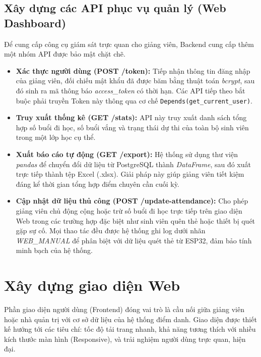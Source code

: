 \documentclass[12pt,a4paper]{report}
\begin{document}
\subsection{Xây dựng các API phục vụ quản lý (Web Dashboard)}

Để cung cấp công cụ giám sát trực quan cho giảng viên, Backend cung cấp thêm một nhóm API được bảo mật chặt chẽ.

\begin{itemize}

\item \textbf{Xác thực người dùng (POST /token):}  
Tiếp nhận thông tin đăng nhập của giảng viên, đối chiếu mật khẩu đã được băm bằng thuật toán \textit{bcrypt}, sau đó sinh ra mã thông báo \textit{access\_token} có thời hạn.  
Các API tiếp theo bắt buộc phải truyền Token này thông qua cơ chế \texttt{Depends(get\_current\_user)}.

\item \textbf{Truy xuất thống kê (GET /stats):}  
API này truy xuất danh sách tổng hợp số buổi đi học, số buổi vắng và trạng thái dự thi của toàn bộ sinh viên trong một lớp học cụ thể.

\item \textbf{Xuất báo cáo tự động (GET /export):}  
Hệ thống sử dụng thư viện \textit{pandas} để chuyển đổi dữ liệu từ PostgreSQL thành \textit{DataFrame}, sau đó xuất trực tiếp thành tệp Excel (.xlsx).  
Giải pháp này giúp giảng viên tiết kiệm đáng kể thời gian tổng hợp điểm chuyên cần cuối kỳ.

\item \textbf{Cập nhật dữ liệu thủ công (POST /update-attendance):}  
Cho phép giảng viên chủ động cộng hoặc trừ số buổi đi học trực tiếp trên giao diện Web trong các trường hợp đặc biệt như sinh viên quên thẻ hoặc thiết bị quét gặp sự cố.  
Mọi thao tác đều được hệ thống ghi log dưới nhãn \textit{WEB\_MANUAL} để phân biệt với dữ liệu quét thẻ từ ESP32, đảm bảo tính minh bạch của hệ thống.

\end{itemize}

\section{Xây dựng giao diện Web}

Phần giao diện người dùng (Frontend) đóng vai trò là cầu nối giữa giảng viên hoặc nhà quản trị với cơ sở dữ liệu của hệ thống điểm danh. Giao diện được thiết kế hướng tới các tiêu chí: tốc độ tải trang nhanh, khả năng tương thích với nhiều kích thước màn hình (Responsive), và trải nghiệm người dùng trực quan, hiện đại.
\end{document}
